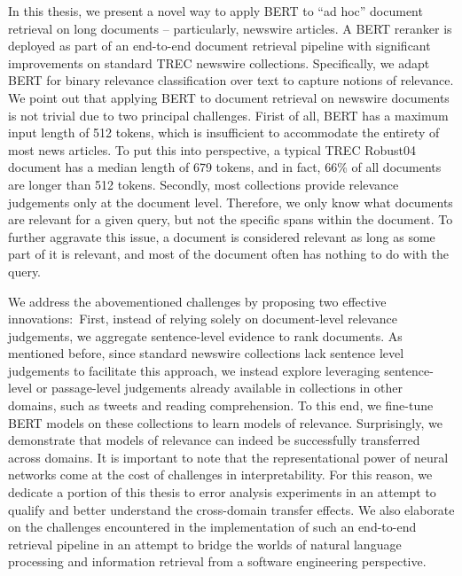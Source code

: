 
In this thesis, we present a novel way to apply BERT to ``ad hoc'' document retrieval on long documents -- particularly, newswire articles.
A BERT reranker is deployed as part of an end-to-end document retrieval pipeline with significant improvements on standard TREC newswire collections.
Specifically, we adapt BERT for binary relevance classification over text to capture notions of relevance.
We point out that applying BERT to document retrieval on newswire documents is not trivial due to two principal challenges.
Firist of all, BERT has a maximum input length of 512 tokens, which is insufficient to accommodate the entirety of most news articles.
To put this into perspective, a typical TREC Robust04 document has a median length of 679 tokens, and in fact, 66\% of all documents are longer than 512 tokens.
Secondly, most collections provide relevance judgements only at the document level.
Therefore, we only know what documents are relevant for a given query, but not the specific spans within the document.
To further aggravate this issue, a document is considered relevant as long as some part of it is relevant, and most of the document often has nothing to do with the query.

We address the abovementioned challenges by proposing two effective innovations:\
First, instead of relying solely on document-level relevance judgements, we aggregate sentence-level evidence to rank documents.
As mentioned before, since standard newswire collections lack sentence level judgements to facilitate this approach, we instead explore leveraging sentence-level or passage-level judgements already available in collections in other domains, such as tweets and reading comprehension.
To this end, we fine-tune BERT models on these collections to learn models of relevance.
Surprisingly, we demonstrate that models of relevance can indeed be successfully transferred across domains.
It is important to note that the representational power of neural networks come at the cost of challenges in interpretability.
For this reason, we dedicate a portion of this thesis to error analysis experiments in an attempt to qualify and better understand the cross-domain transfer effects.
We also elaborate on the challenges encountered in the implementation of such an end-to-end retrieval pipeline in an attempt to bridge the worlds of natural language processing and information retrieval from a software engineering perspective.

